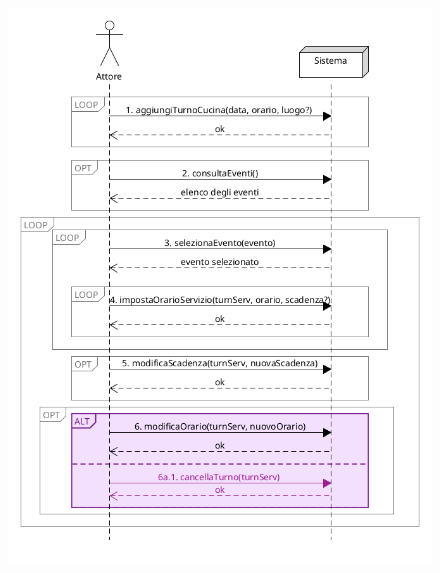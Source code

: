 \begin{figure}[h]
    \begin{center}
      \includegraphics[scale = 0.55]{images/SSD/SSD - Passo 6.png}
    \end{center}
  \end{figure}

